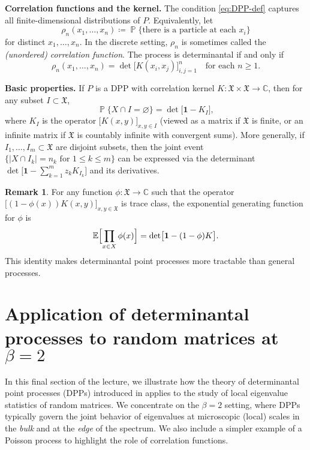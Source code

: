\documentclass[letterpaper,11pt,oneside,reqno]{article}
\numberwithin{equation}{section}
\theoremstyle{definition}
\newtheorem{remark}[proposition]{Remark}
\begin{document}
\noindent\textbf{Correlation functions and the kernel.}
The condition \eqref{eq:DPP-def} captures all finite-dimensional distributions of \(P\).
Equivalently, let
\[
	\rho_n(x_1,\dots,x_n) \coloneqq \operatorname{\mathbb{P}}\{\text{there is a particle at each }x_i\}
\]
for distinct \(x_1,\dots,x_n\). In the discrete setting, \(\rho_n\) is
sometimes called the \emph{(unordered) correlation function}. The process is
determinantal if and only if
\[
\rho_n(x_1,\dots,x_n) = \det\bigl[K(x_i,x_j)\bigr]_{i,j=1}^n
\quad
\text{for each }n\ge1.
\]

\noindent\textbf{Basic properties.} If \(P\) is a DPP with correlation kernel
\(K\colon \mathfrak{X}\times\mathfrak{X}\to\mathbb{C}\), then for any subset \(I\subset \mathfrak{X}\),
\begin{equation}
\label{eq:prob-empty-set-DPP}
\operatorname{\mathbb{P}}\{X\cap I = \varnothing\} = \det\bigl[\mathbf{1} - K_I\bigr],
\end{equation}
where \(K_I\) is the operator \(\bigl[K(x,y)\bigr]_{x,y\in I}\)
(viewed as a matrix if \(\mathfrak{X}\) is finite, or an infinite matrix if \(\mathfrak{X}\) is
countably infinite with convergent sums). More generally, if \(I_1,\dots,I_m\subset \mathfrak{X}\)
are disjoint subsets, then the joint event \(\{|X\cap I_k|=n_k\text{ for }1\le k\le m\}\)
can be expressed via the determinant
\(\det\bigl[\mathbf{1}-\sum_{k=1}^m z_k K_{I_k}\bigr]\)
and its derivatives.

\begin{remark}
For any function \(\phi:\mathfrak{X}\to\mathbb{C}\) such that the operator
\(\bigl[(1-\phi(x))K(x,y)\bigr]_{x,y\in\mathfrak{X}}\) is trace class, the
exponential generating function for \(\phi\) is
\[
\mathbb{E}\Bigl[\prod_{x\in X}\phi(x)\Bigr] = \det\bigl[\mathbf{1} - (1-\phi)K\bigr].
\]
This identity makes determinantal point processes more tractable than general processes.
\end{remark}


\section{Application of determinantal processes to random matrices at \texorpdfstring{$\beta=2$}{beta=2}}

In this final section of the lecture, we illustrate how the theory of determinantal point processes (DPPs)
introduced in 
applies to the study of local eigenvalue statistics of random matrices.
We concentrate on the \(\beta=2\) setting, where DPPs typically
govern the joint behavior of eigenvalues at microscopic (local)
scales in the \emph{bulk} and at the \emph{edge} of the spectrum.
We also include a simpler example of a Poisson process to highlight
the role of correlation functions.
\end{document}
